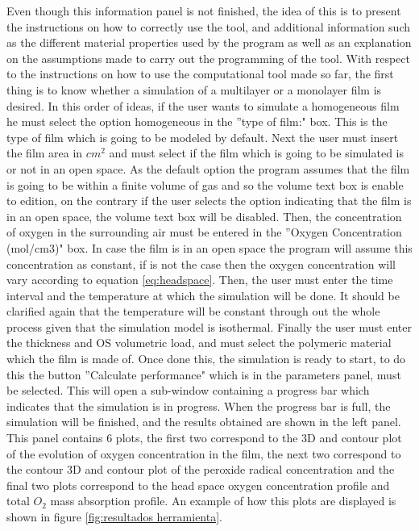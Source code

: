 \begin{refsection}
Even though this information panel is not finished, the idea of this is to present the instructions on how to correctly use the tool,  and additional information such as the different material properties used by the program as well as an explanation on the assumptions made to carry out the programming of the tool. With respect to the instructions on how to use the computational tool made so far, the first thing is to know whether a simulation of a multilayer or a monolayer film is desired. In this order of ideas, if the user wants to simulate a homogeneous film he must select the option homogeneous in the ''type of film:" box. This is the type of film which is  going to be modeled by default. Next the user must insert the film area in $cm^2$ and must select if the film which is going to be simulated is or not in an open space. As the default option the program assumes that the film is going to be within a finite volume of gas and so the volume text box is enable to edition, on the contrary if the user selects the option indicating that the film is in an open space, the volume text box will be disabled. Then, the concentration of oxygen in the surrounding air must be entered in the ''Oxygen Concentration (mol/cm3)" box. In case the film is in an open space the program will assume this concentration as constant, if is not the case then the oxygen concentration will vary according to equation  \ref{eq:headspace}. Then, the user must enter the time interval and the temperature at which the simulation will be done. It should be clarified again that the temperature will be constant through out the whole process given that the simulation model is isothermal. Finally the user must enter the thickness and OS volumetric load, and must select the polymeric material which the film is made of. Once done this, the simulation is ready to start, to do this the button ''Calculate performance" which is in the parameters panel, must be selected. This will open a sub-window containing a progress bar which indicates that the simulation is in progress. When the progress bar is full, the simulation will be finished, and the results obtained are shown in the left panel. This panel contains 6 plots, the first two correspond to the 3D and contour plot of the evolution of oxygen concentration in the film, the next two correspond to the contour 3D and contour plot of the peroxide radical concentration and the final two plots correspond to the head space oxygen concentration profile and total $O_2$ mass absorption profile. An example of how this plots are displayed is shown in figure \ref{fig:resultados herramienta}. 


\end{refsection}
